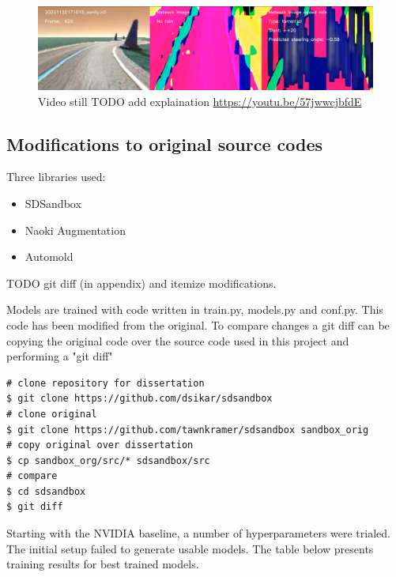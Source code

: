\begin{figure}[ht]
 \centering 
 \includegraphics[width=\textwidth]{Figures/tcpflow_Run43.png}
 \caption{Video still TODO add explaination \href{https://youtu.be/57jwwcjbfdE}{https://youtu.be/57jwwcjbfdE}}
 \label{fig:tcpflow_Run43} 
\end{figure}

\subsection{Modifications to original source codes}
Three libraries used:
\begin{itemize}
    \item SDSandbox
    \item Naoki Augmentation
    \item Automold
\end{itemize}
TODO git diff (in appendix) and itemize modifications.
    
Models are trained with code written in train.py, models.py and conf.py. This code has been modified from the original. To compare changes a git diff can be copying the original code over the source code used in this project and performing a "git diff"
\begin{verbatim}
# clone repository for dissertation
$ git clone https://github.com/dsikar/sdsandbox
# clone original
$ git clone https://github.com/tawnkramer/sdsandbox sandbox_orig
# copy original over dissertation
$ cp sandbox_org/src/* sdsandbox/src
# compare
$ cd sdsandbox 
$ git diff
\end{verbatim}


Starting with the NVIDIA baseline, a number of hyperparameters were trialed. The initial setup failed to generate usable models. 
The table below presents training results for best trained models.

